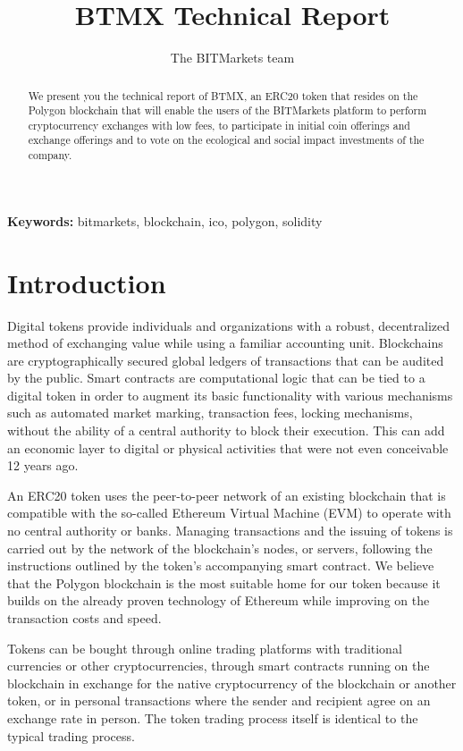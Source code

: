 \documentclass[a4paper,12pt]{article}
\title{BTMX Technical Report}
\author{The BITMarkets team}
\providecommand{\keywords}[1]{\textbf{Keywords: } #1}
\begin{document}
\maketitle

\begin{abstract}

We present you the technical report of BTMX, an ERC20 token that resides on the Polygon blockchain that will enable
the users of the BITMarkets platform to perform cryptocurrency exchanges with low fees,
to participate in initial coin offerings and exchange offerings and to
vote on the ecological and social impact investments of the company.

\end{abstract}

\keywords{bitmarkets, blockchain, ico, polygon, solidity}

\section{Introduction}

Digital tokens provide individuals and organizations with a robust, decentralized
method of exchanging value while using a familiar accounting unit.
Blockchains are cryptographically secured global ledgers of transactions that can be
audited by the public.
Smart contracts are computational logic that can be tied to a digital token in order to
augment its basic functionality with various mechanisms such as automated market marking, transaction fees, locking mechanisms,
without the ability of a central authority to block their execution.
This can add an economic layer to digital or physical activities
that were not even conceivable 12 years ago.

An ERC20 token uses the peer-to-peer network of an existing blockchain that is compatible
with the so-called Ethereum Virtual Machine (EVM) to operate with
no central authority or banks.
Managing transactions and the issuing of tokens is carried out by the network of the
blockchain's nodes, or servers, following the instructions outlined by the token's
accompanying smart contract.
We believe that the Polygon blockchain is the most suitable home for our token
because it builds on the already proven technology of Ethereum while improving on the
transaction costs and speed.

Tokens can be bought through online trading platforms with traditional currencies or
other cryptocurrencies,
through smart contracts running on the blockchain in exchange for the native
cryptocurrency of the blockchain or another token, or in personal transactions where the
sender and recipient agree on an exchange rate in person.
The token trading process itself is identical to the typical trading process.
\end{document}
